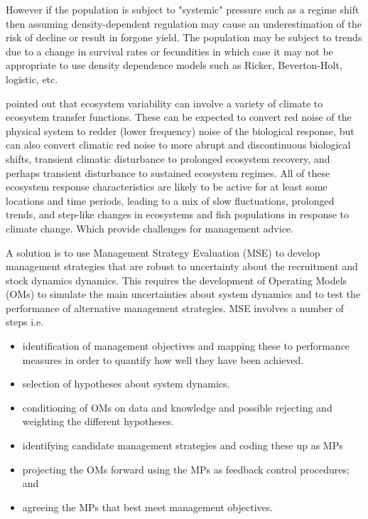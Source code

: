 \documentclass[a4paper, 10pt]{article}
\begin{document}
However if the population is subject to "systemic" pressure \cite{Shaffer1981} such as a regime shift then assuming density-dependent 
regulation may cause an underestimation of the risk of decline or result in forgone yield. The population may be subject to
trends due to a change in survival rates or fecundities in which case it may not be appropriate to use density dependence 
models such as Ricker, Beverton-Holt, logistic, etc.  

\cite{overland2010climate} pointed out that ecosystem variability can involve a variety of climate to
ecosystem transfer functions. These can be expected to convert red noise of the physical system to redder
(lower frequency) noise of the biological response, but can also convert climatic red noise to more abrupt and
discontinuous biological shifts, transient climatic disturbance to prolonged ecosystem recovery, and perhaps
transient disturbance to sustained ecosystem regimes. All of these ecosystem response characteristics are likely
to be active for at least some locations and time periods, leading to a mix of slow fluctuations, prolonged trends,
and step-like changes in ecosystems and fish populations in response to climate change. Which provide
challenges for management advice.

A solution is to use Management Strategy Evaluation (MSE) to develop management strategies that are robust to
uncertainty about the recruitment and stock dynamics dynamics. 
This requires the development of Operating Models (OMs) to simulate the main uncertainties about system dynamics and 
to test the performance  of alternative management strategies. MSE involves a number of steps \cite{punt_developing_2007} i.e.

\begin{itemize}
 \item identification of management objectives and mapping these to performance measures in order to quantify how well they have been achieved.
 \item selection of hypotheses about system dynamics.
 \item conditioning of OMs on data and knowledge and possible rejecting and weighting the different hypotheses.
 \item identifying candidate management strategies and coding these up as MPs %
 \item projecting the OMs forward using the MPs as feedback control procedures; and
 \item agreeing the MPs that best meet  management objectives.
\end{itemize}
\end{document}
